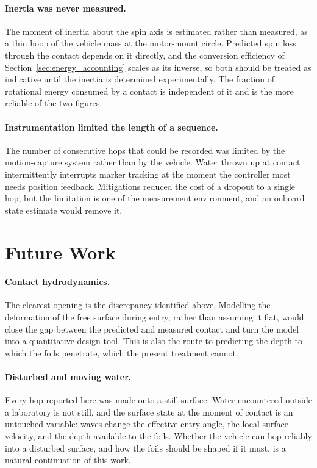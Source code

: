 \paragraph{Inertia was never measured.}
The moment of inertia about the spin axis is estimated rather than measured,
as a thin hoop of the vehicle mass at the motor-mount circle.  Predicted spin
loss through the contact depends on it directly, and the conversion efficiency
of Section~\ref{sec:energy_accounting} scales as its inverse, so both should
be treated as indicative until the inertia is determined experimentally.  The
fraction of rotational energy consumed by a contact is independent of it and
is the more reliable of the two figures.

\paragraph{Instrumentation limited the length of a sequence.}
The number of consecutive hops that could be recorded was limited by the
motion-capture system rather than by the vehicle.  Water thrown up at contact
intermittently interrupts marker tracking at the moment the controller most
needs position feedback.  Mitigations reduced the cost of a dropout to a
single hop, but the limitation is one of the measurement environment, and an
onboard state estimate would remove it.

\section{Future Work}

\paragraph{Contact hydrodynamics.}
The clearest opening is the discrepancy identified above.  Modelling the
deformation of the free surface during entry, rather than assuming it flat,
would close the gap between the predicted and measured contact and turn the
model into a quantitative design tool.  This is also the route to predicting
the depth to which the foils penetrate, which the present treatment cannot.

\paragraph{Disturbed and moving water.}
Every hop reported here was made onto a still surface.  Water encountered
outside a laboratory is not still, and the surface state at the moment of
contact is an untouched variable: waves change the effective entry angle, the
local surface velocity, and the depth available to the foils.  Whether the
vehicle can hop reliably into a disturbed surface, and how the foils should be
shaped if it must, is a natural continuation of this work.

